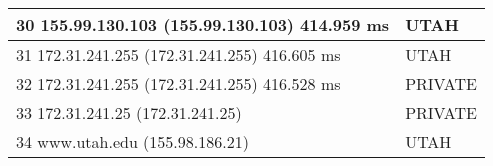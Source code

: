 \begin{table}[!ht]
\begin{tabular}{|l|l|}
30  155.99.130.103 (155.99.130.103)  414.959 ms                             & UTAH                                                                            \\ \hline
31  172.31.241.255 (172.31.241.255)  416.605 ms                             & UTAH                                                                            \\ \hline
32  172.31.241.255 (172.31.241.255)  416.528 ms                             & PRIVATE                                                                         \\ \hline
33  172.31.241.25 (172.31.241.25)                                           & PRIVATE                                                                         \\ \hline
34  www.utah.edu (155.98.186.21)                                            & UTAH                                                                            \\ \hline
\end{tabular}
\end{table}
